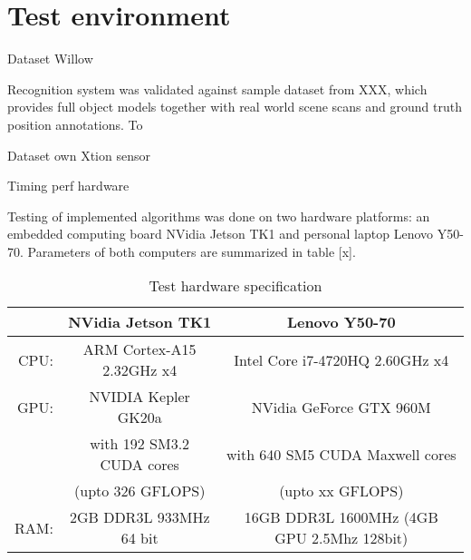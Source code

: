 \section{Test environment}
\label{sec:testhardware}

Dataset Willow

Recognition system was validated against sample dataset from XXX, which provides full object models together with real world scene scans and ground truth position annotations. To 



Dataset own
Xtion sensor


Timing perf hardware

Testing of implemented algorithms was done on two hardware platforms: an embedded computing board NVidia Jetson TK1 and personal laptop Lenovo Y50-70. Parameters of both computers are summarized in table [x]. 

\begin{table}[H]
\centering
\begin{tabular}{r c | c}
& NVidia Jetson TK1 & Lenovo Y50-70 \\ 
 \hline
 CPU:& ARM Cortex-A15 2.32GHz x4 & Intel Core i7-4720HQ 2.60GHz x4\\
 GPU:& NVIDIA Kepler GK20a & NVidia GeForce GTX 960M \\
 &with 192 SM3.2 CUDA cores& with 640 SM5 CUDA Maxwell cores\\
 &(upto 326 GFLOPS)&(upto xx GFLOPS)\\
 RAM:& 2GB DDR3L 933MHz 64 bit&  16GB DDR3L 1600MHz (4GB GPU 2.5Mhz 128bit)
\end{tabular}
\caption{Test hardware specification}
\label{tab:hardware}
\end{table}



